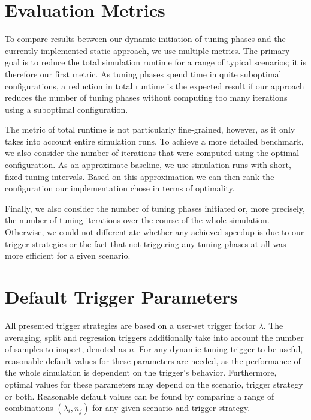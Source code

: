 \section{Evaluation Metrics}
\label{sec:metrics}
To compare results between our dynamic initiation of tuning phases and the currently implemented static approach, we use multiple metrics.
The primary goal is to reduce the total simulation runtime for a range of typical scenarios; it is therefore our first metric. As tuning phases spend time in quite suboptimal configurations, a reduction in total runtime is the expected result if our approach reduces the number of tuning phases without computing too many iterations using a suboptimal configuration.

The metric of total runtime is not particularly fine-grained, however, as it only takes into account entire simulation runs. To achieve a more detailed benchmark, we also consider the number of iterations that were computed using the optimal configuration. As an approximate baseline, we use simulation runs with short, fixed tuning intervals. Based on this approximation we can then rank the configuration our implementation chose in terms of optimality.

Finally, we also consider the number of tuning phases initiated or, more precisely, the number of tuning iterations over the course of the whole simulation. Otherwise, we could not differentiate whether any achieved speedup is due to our trigger strategies or the fact that not triggering any tuning phases at all was more efficient for a given scenario.

\section{Default Trigger Parameters}
\label{sec:default_params}
All presented trigger strategies are based on a user-set trigger factor $\lambda$. The averaging, split and regression triggers additionally take into account the number of samples to inspect, denoted as $n$. For any dynamic tuning trigger to be useful, reasonable default values for these parameters are needed, as the performance of the whole simulation is dependent on the trigger's behavior.
Furthermore, optimal values for these parameters may depend on the scenario, trigger strategy or both.
Reasonable default values can be found by comparing a range of combinations $\left(\lambda_i, n_j\right)$ for any given scenario and trigger strategy.



